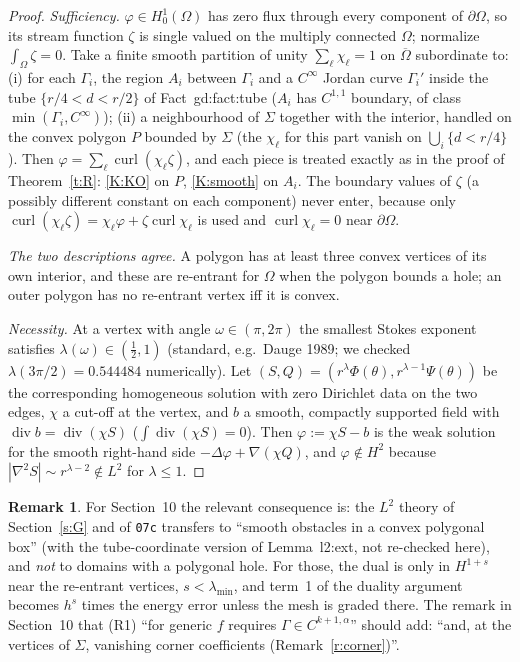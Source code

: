 \documentclass[11pt,reqno]{amsart}
\theoremstyle{plain}
\theoremstyle{definition}
\newtheorem{remark}[theorem]{Remark}
\newcommand{\curl}{\operatorname{curl}}
\renewcommand{\div}{\operatorname{div}}
\begin{document}
\begin{proof}
\emph{Sufficiency.} $\varphi\in H^1_0(\Omega)$ has zero flux through every component of $\partial\Omega$, so its stream function $\zeta$ is single valued on the multiply connected $\Omega$; normalize $\int_\Omega\zeta=0$. Take a finite smooth partition of unity $\sum_\ell\chi_\ell=1$ on $\overline\Omega$ subordinate to: (i) for each $\Gamma_i$, the region $A_i$ between $\Gamma_i$ and a $C^\infty$ Jordan curve $\Gamma_i'$ inside the tube $\{r/4<d<r/2\}$ of Fact~gd:fact:tube ($A_i$ has $C^{1,1}$ boundary, of class $\min(\Gamma_i,C^\infty)$); (ii) a neighbourhood of $\Sigma$ together with the interior, handled on the convex polygon $P$ bounded by $\Sigma$ (the $\chi_\ell$ for this part vanish on $\bigcup_i\{d<r/4\}$). Then $\varphi=\sum_\ell\curl(\chi_\ell\zeta)$, and each piece is treated exactly as in the proof of Theorem~\ref{t:R}: \ref{K:KO} on $P$, \ref{K:smooth} on $A_i$. The boundary values of $\zeta$ (a possibly different constant on each component) never enter, because only $\curl(\chi_\ell\zeta)=\chi_\ell\varphi+\zeta\curl\chi_\ell$ is used and $\curl\chi_\ell=0$ near $\partial\Omega$.

\emph{The two descriptions agree.} A polygon has at least three convex vertices of its own interior, and these are re-entrant for $\Omega$ when the polygon bounds a hole; an outer polygon has no re-entrant vertex iff it is convex.

\emph{Necessity.} At a vertex with angle $\omega\in(\pi,2\pi)$ the smallest Stokes exponent satisfies $\lambda(\omega)\in(\frac12,1)$ (standard, e.g.\ Dauge 1989; we checked $\lambda(3\pi/2)=0.544484$ numerically). Let $(S,Q)=(r^\lambda\Phi(\theta),r^{\lambda-1}\Psi(\theta))$ be the corresponding homogeneous solution with zero Dirichlet data on the two edges, $\chi$ a cut-off at the vertex, and $b$ a smooth, compactly supported field with $\div b=\div(\chi S)$ ($\int\div(\chi S)=0$). Then $\varphi:=\chi S-b$ is the weak solution for the smooth right-hand side $-\Delta\varphi+\nabla(\chi Q)$, and $\varphi\notin H^2$ because $|\nabla^2S|\sim r^{\lambda-2}\notin L^2$ for $\lambda\le1$.
\end{proof}

\begin{remark}
For Section~10 the relevant consequence is: the $L^2$ theory of Section~\ref{s:G} and of \texttt{07c} transfers to ``smooth obstacles in a convex polygonal box'' (with the tube-coordinate version of Lemma~l2:ext, not re-checked here), and \emph{not} to domains with a polygonal hole. For those, the dual is only in $H^{1+s}$ near the re-entrant vertices, $s<\lambda_{\min}$, and term~1 of the duality argument becomes $h^{s}$ times the energy error unless the mesh is graded there. The remark in Section~10 that (R1) ``for generic $f$ requires $\Gamma\in C^{k+1,\alpha}$'' should add: ``and, at the vertices of $\Sigma$, vanishing corner coefficients (Remark~\ref{r:corner})''.
\end{remark}
\end{document}
